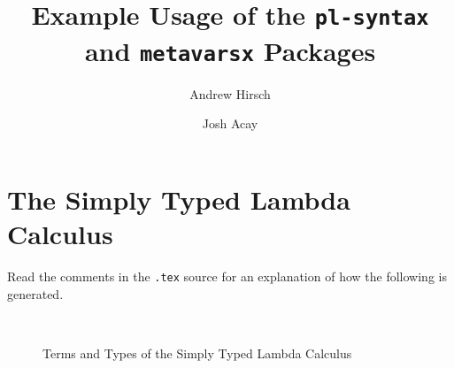 \documentclass{article}
\title{Example Usage of the \texttt{pl-syntax} and \texttt{metavarsx} Packages}
\author{Andrew Hirsch \and Josh Acay}
\begin{document}
\maketitle

\section{The Simply Typed Lambda Calculus}

Read the comments in the \texttt{.tex} source for an explanation of how
the following is generated.

\begin{figure}[h]
  \begin{syntax}




    \separate

    \category[Types]{\tau}
    \\

    \category[Contexts]{\Gamma}


  \end{syntax}

  \caption{Terms and Types of the Simply Typed Lambda Calculus}
  \label{fig:abstract-syntax}
\end{figure}
\end{document}
